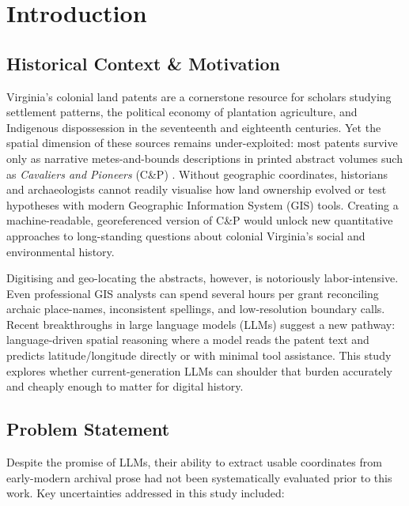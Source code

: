 \section{Introduction}\label{introduction}

\subsection{Historical Context \&
Motivation}\label{historical-context-motivation}

Virginia's colonial land patents are a cornerstone resource for scholars
studying settlement patterns, the political economy of plantation
agriculture, and Indigenous dispossession in the seventeenth and
eighteenth centuries. Yet the spatial dimension of these sources remains
under-exploited: most patents survive only as narrative metes-and-bounds
descriptions in printed abstract volumes such as \emph{Cavaliers and
Pioneers} (C\&P) \citep{Nugent1979_cavaliers3}. Without geographic
coordinates, historians and archaeologists cannot readily visualise how
land ownership evolved or test hypotheses with modern Geographic
Information System (GIS) tools. Creating a machine-readable,
georeferenced version of C\&P would unlock new quantitative approaches
to long-standing questions about colonial Virginia's social and
environmental history.

Digitising and geo-locating the abstracts, however, is notoriously
labor-intensive. Even professional GIS analysts can spend several hours
per grant reconciling archaic place-names, inconsistent spellings, and
low-resolution boundary calls. Recent breakthroughs in large language
models (LLMs) suggest a new pathway: language-driven spatial reasoning
where a model reads the patent text and predicts latitude/longitude
directly or with minimal tool assistance. This study explores whether
current-generation LLMs can shoulder that burden accurately and cheaply
enough to matter for digital history.

\subsection{Problem Statement}\label{problem-statement}

Despite the promise of LLMs, their ability to extract usable coordinates
from early-modern archival prose had not been systematically evaluated
prior to this work. Key uncertainties addressed in this study included:

